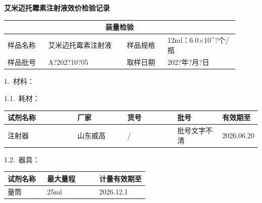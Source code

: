 \documentclass[UTF8,10pt,a4paper,fontset=fandol]{ctexart}
\newcommand{\fieldvalue}[1]{#1}
\newcommand{\handwritten}[1]{#1}
\begin{document}
\newpage

\begin{center}
\textbf{艾米迈托霉素注射液效价检验记录}
\end{center}

\begin{tabular}{|p{0.16\linewidth}|p{0.31\linewidth}|p{0.16\linewidth}|p{0.28\linewidth}|}
\hline
\multicolumn{4}{|c|}{装量检验}\\
\hline
样品名称 &
\fieldvalue{艾米迈托霉素注射液} &
样品规格 &
\fieldvalue{12ml：6.0$\times$10^{?}个/瓶}\\
\hline
样品批号 &
\fieldvalue{\handwritten{A?202?10?05}} &
取样日期 &
\fieldvalue{\handwritten{202?年?月?日}}\\
\hline
\end{tabular}

\medskip

1.\ 材料：

\medskip

1.1.\ 耗材：

\begin{tabular}{|p{0.28\linewidth}|p{0.20\linewidth}|p{0.20\linewidth}|p{0.18\linewidth}|p{0.14\linewidth}|}
\hline
试剂名称 & 厂家 & 货号 & 批号 & 有效期至\\
\hline
注射器 &
\fieldvalue{\handwritten{山东威高}} &
\fieldvalue{\handwritten{/}} &
\fieldvalue{\handwritten{批号文字不清}} &
\fieldvalue{\handwritten{2026.06.20}}\\
\hline
\end{tabular}

\medskip

1.2.\ 器具：

\begin{tabular}{|p{0.28\linewidth}|p{0.37\linewidth}|p{0.35\linewidth}|}
\hline
试剂名称 & 最大量程 & 计量有效期至\\
\hline
量筒 &
\fieldvalue{25ml} &
\fieldvalue{\handwritten{2026.12.1}}\\
\hline
\end{tabular}
\end{document}
